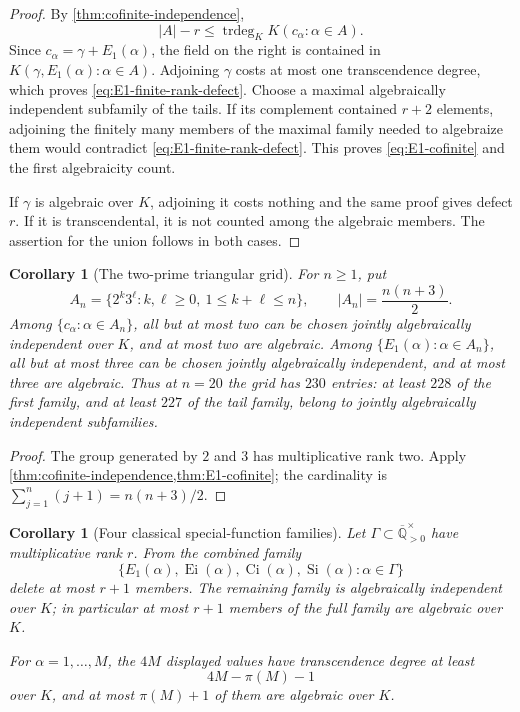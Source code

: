 \documentclass[11pt]{article}
\newtheorem{corollary}[theorem]{Corollary}
\theoremstyle{definition}
\theoremstyle{remark}
\newcommand{\Qbar}{\overline{\mathbb Q}}
\newcommand{\Ei}{\operatorname{Ei}}
\newcommand{\Ci}{\operatorname{Ci}}
\newcommand{\trdeg}{\operatorname{trdeg}}
\begin{document}
\begin{proof}
By \cref{thm:cofinite-independence},
\[
 |A|-r\le\trdeg_KK(c_\alpha:\alpha\in A).
\]
Since \(c_\alpha=\gamma+E_1(\alpha)\), the field on the right is contained
in \(K(\gamma,E_1(\alpha):\alpha\in A)\).  Adjoining \(\gamma\) costs at
most one transcendence degree, which proves
\eqref{eq:E1-finite-rank-defect}.  Choose a maximal algebraically
independent subfamily of the tails.  If its complement contained \(r+2\)
elements, adjoining the finitely many members of the maximal family needed
to algebraize them would contradict \eqref{eq:E1-finite-rank-defect}.
This proves \eqref{eq:E1-cofinite} and the first algebraicity count.

If \(\gamma\) is algebraic over \(K\), adjoining it costs nothing and the
same proof gives defect \(r\).  If it is transcendental, it is not counted
among the algebraic members.  The assertion for the union follows in both
cases.
\end{proof}

\begin{corollary}[The two-prime triangular grid]
\label{cor:two-prime-grid}
For \(n\ge1\), put
\[
 A_n=\{2^k3^\ell:k,\ell\ge0,\ 1\le k+\ell\le n\},
 \qquad |A_n|=\frac{n(n+3)}2.
\]
Among \(\{c_\alpha:\alpha\in A_n\}\), all but at most two can be chosen
jointly algebraically independent over \(K\), and at most two are
algebraic.  Among \(\{E_1(\alpha):\alpha\in A_n\}\), all but at most three
can be chosen jointly algebraically independent, and at most three are
algebraic.  Thus at \(n=20\) the grid has \(230\) entries: at least \(228\)
of the first family, and at least \(227\) of the tail family, belong to
jointly algebraically independent subfamilies.
\end{corollary}

\begin{proof}
The group generated by \(2\) and \(3\) has multiplicative rank two.  Apply
\cref{thm:cofinite-independence,thm:E1-cofinite}; the cardinality is
\(\sum_{j=1}^n(j+1)=n(n+3)/2\).
\end{proof}

\begin{corollary}[Four classical special-function families]
\label{cor:four-classical-cofinite}
Let \(\Gamma\subset\Qbar_{>0}^{\times}\) have multiplicative rank \(r\).
From the combined family
\begin{equation}\label{eq:four-classical-family}
 \{E_1(\alpha),\Ei(\alpha),\Ci(\alpha),
   \operatorname{Si}(\alpha):\alpha\in\Gamma\}
\end{equation}
delete at most \(r+1\) members.  The remaining family is algebraically
independent over \(K\); in particular at most \(r+1\) members of the full
family are algebraic over \(K\).

For \(\alpha=1,\ldots,M\), the \(4M\) displayed values have transcendence
degree at least
\begin{equation}\label{eq:four-classical-integer-count}
 4M-\pi(M)-1
\end{equation}
over \(K\), and at most \(\pi(M)+1\) of them are algebraic over \(K\).
\end{corollary}
\end{document}
